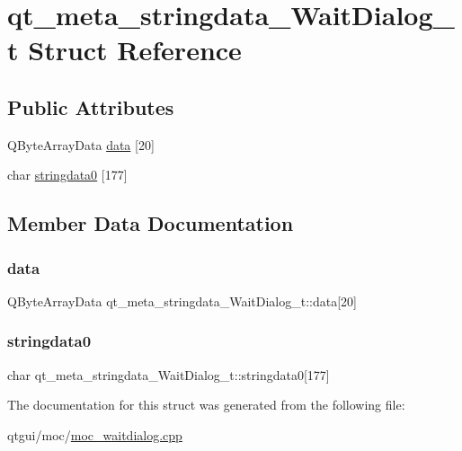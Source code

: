 \hypertarget{structqt__meta__stringdata___wait_dialog__t}{}\section{qt\+\_\+meta\+\_\+stringdata\+\_\+\+Wait\+Dialog\+\_\+t Struct Reference}
\label{structqt__meta__stringdata___wait_dialog__t}
\subsection*{Public Attributes}
\begin{DoxyCompactItemize}
\item 
Q\+Byte\+Array\+Data \mbox{\hyperlink{structqt__meta__stringdata___wait_dialog__t_a781632b745c07aecb0a01157f6f76075}{data}} \mbox{[}20\mbox{]}
\item 
char \mbox{\hyperlink{structqt__meta__stringdata___wait_dialog__t_a63efc9dfa2334a0a5cdb84e2cf048ecc}{stringdata0}} \mbox{[}177\mbox{]}
\end{DoxyCompactItemize}


\subsection{Member Data Documentation}
\mbox{\label{structqt__meta__stringdata___wait_dialog__t_a781632b745c07aecb0a01157f6f76075}} 
\subsubsection{\texorpdfstring{data}{data}}
{\footnotesize\ttfamily Q\+Byte\+Array\+Data qt\+\_\+meta\+\_\+stringdata\+\_\+\+Wait\+Dialog\+\_\+t\+::data\mbox{[}20\mbox{]}}

\mbox{\label{structqt__meta__stringdata___wait_dialog__t_a63efc9dfa2334a0a5cdb84e2cf048ecc}} 
\subsubsection{\texorpdfstring{stringdata0}{stringdata0}}
{\footnotesize\ttfamily char qt\+\_\+meta\+\_\+stringdata\+\_\+\+Wait\+Dialog\+\_\+t\+::stringdata0\mbox{[}177\mbox{]}}



The documentation for this struct was generated from the following file\+:\begin{DoxyCompactItemize}
\item 
qtgui/moc/\mbox{\hyperlink{moc__waitdialog_8cpp}{moc\+\_\+waitdialog.\+cpp}}\end{DoxyCompactItemize}
